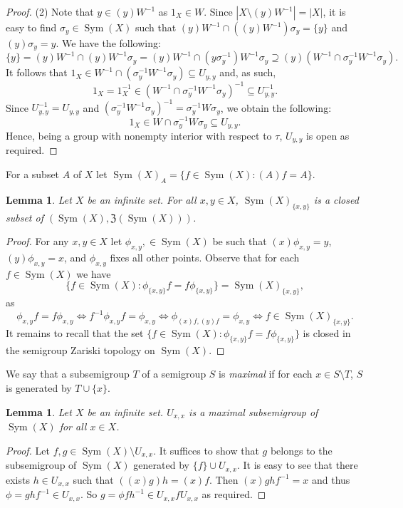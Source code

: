\documentclass[11pt]{amsart}
\newtheorem{lemma}[theorem]{Lemma}
\theoremstyle{definition}
\newcommand{\Sym}{\operatorname{Sym}}
\begin{document}
\begin{proof}
(2) Note that \(y\in (y)W^{-1}\) as \(1_{X}\in W\). Since $|X\setminus (y)W^{-1}|=|X|$, it is easy to find \(\sigma_y\in \Sym(X)\) such that \((y)W^{-1}\cap ((y)W^{-1})\sigma_y = \{y\}\) and \((y)\sigma_y=y\). We have the following: 
\[\{y\}= (y)W^{-1}\cap (y)W^{-1}\sigma_y= (y)W^{-1} \cap (y\sigma_y^{-1})W^{-1}\sigma_y\supseteq (y)(W^{-1}\cap \sigma_y^{-1} W^{-1} \sigma_y).\]
It follows that \(1_X\in W^{-1}\cap (\sigma_y^{-1}W^{-1}\sigma_y )\subseteq U_{y,y}\) and, as such, $$1_X=1_X^{-1} \in (W^{-1}\cap \sigma_y^{-1} W^{-1} \sigma_y)^{-1} \subseteq U_{y,y}^{-1}.$$
Since $U_{y,y}^{-1}=U_{y,y}$ and $(\sigma_y^{-1} W^{-1} \sigma_y)^{-1}= \sigma_y^{-1} W \sigma_y$, we obtain the following:
$$1_X \in W\cap \sigma_y^{-1} W \sigma_y \subseteq U_{y,y}.$$ 
Hence, being a group with nonempty interior with respect to $\tau$, \(U_{y,y}\) is open as required.
\end{proof}


For a subset $A$ of $X$ let $\Sym(X)_A=\{f\in\Sym(X): (A)f=A\}$.
\begin{lemma}\label{sstab(x,y) closed}
Let \(X\) be an infinite set. 
For all \(x,y\in X\), \(\Sym(X)_{\{x,y\}}\) is a closed subset of \((\Sym(X),\mathfrak Z(\Sym(X)))\).
\end{lemma}
\begin{proof}
For any $x,y\in X$ let \(\phi_{x, y}, \in \Sym(X)\) be such that \((x)\phi_{x, y}=y\), \((y)\phi_{x, y}=x\), and $\phi_{x,y}$ fixes all other points. Observe that for each \(f\in \Sym(X)\) we have $$\{f\in \Sym(X):\phi_{\{x,y\}}f = f\phi_{\{x,y\}}\}=\Sym(X)_{\{x,y\}},$$ as
\[\phi_{x,y}f=f\phi_{x,y} \iff f^{-1}\phi_{x,y}f=\phi_{x,y} \iff \phi_{(x)f,(y)f}=\phi_{x,y} \iff f\in \Sym(X)_{\{x,y\}}.\]
It remains to recall that the set \(\{f\in \Sym(X):\phi_{\{x,y\}}f = f\phi_{\{x,y\}}\}\) is closed in the semigroup Zariski topology on \(\Sym(X)\).
\end{proof}


We say that a subsemigroup \(T\) of a semigroup \(S\) is {\em maximal} if for each $x\in S\setminus T$, $S$ is generated by $T\cup\{x\}$.




\begin{lemma}\label{maximal subsemigroup}
Let \(X\) be an infinite set. \(U_{x,x}\) is a maximal subsemigroup of \(\Sym(X)\) for all  \(x\in X\).
\end{lemma}
\begin{proof}
Let \(f,g\in \Sym(X)\setminus U_{x,x}\). It suffices to show that $g$ belongs to the subsemigroup of $\Sym(X)$ generated by $\{f\}\cup U_{x,x}$. It is easy to see that there exists \(h\in U_{x,x}\) such that \(((x)g)h = (x)f\). Then \((x)ghf^{-1}= x\) and thus \(\phi=ghf^{-1}\in U_{x,x}\). So
\(g=\phi fh^{-1}\in U_{x, x} f U_{x, x}\) 
as required.
\end{proof}
\end{document}
